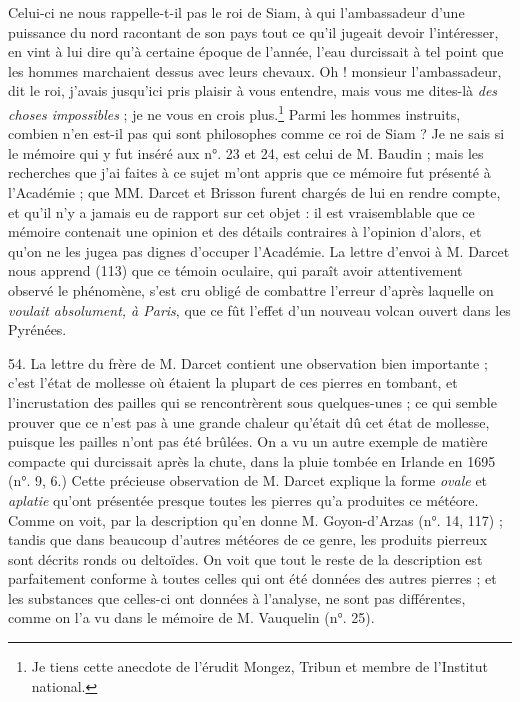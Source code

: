\documentclass[a4paper, 11pt, oneside, polutonikogreek, french]{article}
\begin{document}
{\hspace*{5mm}Celui-ci ne nous rappelle-t-il pas le roi de Siam, à qui l'ambassadeur d'une puissance du nord racontant de son pays tout ce qu'il jugeait devoir l'intéresser, en vint à lui dire qu'à certaine époque de l'année, l'eau durcissait à tel point que les hommes marchaient dessus avec leurs chevaux. \og Oh ! monsieur l'ambassadeur, dit le roi, j'avais jusqu'ici pris plaisir à vous entendre, mais vous me dites-là \emph{des choses impossibles} ; je ne vous en crois plus.\footnote{Je tiens cette anecdote de l'érudit Mongez, Tribun et membre de l'Institut national.} \fg Parmi les hommes instruits, combien n'en est-il pas qui sont philosophes comme ce roi de Siam ?} Je ne sais si le mémoire qui y fut inséré aux n°. 23 et 24, est celui de M. Baudin ; mais les recherches que j'ai faites à ce sujet m'ont appris que ce mémoire fut présenté à l'Académie ; que MM. Darcet et Brisson furent chargés de lui en rendre compte, et qu'il n'y a jamais eu de rapport sur cet objet : il est vraisemblable que ce mémoire contenait une opinion et des détails contraires à l'opinion d'alors, et qu'on ne les jugea pas dignes d'occuper l'Académie. La lettre d'envoi à M. Darcet nous apprend (113) que ce témoin oculaire, qui paraît avoir attentivement observé le phénomène, s'est cru obligé de combattre l'erreur d'après laquelle on \emph{voulait absolument, à Paris}, que ce fût l'effet d'un nouveau volcan ouvert dans les Pyrénées.

54. La lettre du frère de M. Darcet contient une observation bien importante ; c'est l'état de mollesse où étaient la plupart de ces pierres en tombant, et l'incrustation des pailles qui se rencontrèrent sous quelques-unes ; ce qui semble prouver que ce n'est pas à une grande chaleur qu'était dû cet état de mollesse, puisque les pailles n'ont pas été brûlées. On a vu un autre exemple de matière compacte qui durcissait après la chute, dans la pluie tombée en Irlande en 1695 (n°. 9, 6.) Cette précieuse observation de M. Darcet explique la forme \emph{ovale} et \emph{aplatie} qu'ont présentée presque toutes les pierres qu'a produites ce météore. Comme on voit, par la description qu'en donne M. Goyon-d'Arzas (n°. 14, 117) ; tandis que dans beaucoup d'autres météores de ce genre, les produits pierreux sont décrits ronds ou deltoïdes. On voit que tout le reste de la description est parfaitement conforme à toutes celles qui ont été données des autres pierres ; et les substances que celles-ci ont données à l'analyse, ne sont pas différentes, comme on l’a vu dans le mémoire de M. Vauquelin (n°. 25).
\end{document}
